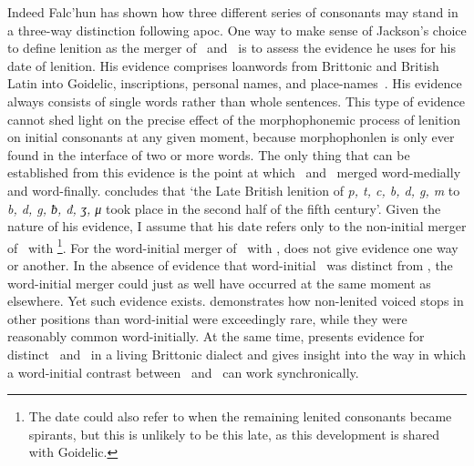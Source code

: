 Indeed Falc'hun has shown how three different series of consonants may stand in a three-way distinction following \gls{apoc}. One way to make sense of Jackson's choice to define lenition as the merger of \lT\ and \xD\  is to assess the evidence he uses for his date of lenition. His evidence comprises loanwords from Brittonic and British Latin into Goidelic, inscriptions, personal names, and place-names~\autocite[§§~133–134]{jackson_language_1953}. His evidence always consists of single words rather than whole sentences. This type of evidence cannot shed light on the precise effect of the morphophonemic process of lenition on initial consonants at any given moment, because \gls{morphophonlen} is only ever found in the interface of two or more words. The only thing that can be established from this evidence is the point at which \lT\ and \xD\ merged word-medially and word-finally. \Textcite[§~142]{jackson_language_1953} concludes that `the Late British lenition of \textit{p, t, c, b, d, g, m} to \textit{b, d, g, ƀ, đ, ʒ, μ} took place in the second half of the fifth century'. Given the nature of his evidence, I assume that his date  refers only to the non-initial merger of \lT\ with \xD\footnote{The date could also refer to when the remaining lenited consonants became spirants, but this is unlikely to be this late, as this development is shared with Goidelic.}. For the word-initial merger of \lT\ with \xD, \textcite{jackson_language_1953} does not give evidence one way or another. In the absence of evidence that word-initial \lT\ was distinct from \xD,  the word-initial merger could just as well have occurred at the same moment as elsewhere. Yet such evidence exists.  \Textcite{martinet_celtic_1952} demonstrates how non-lenited voiced stops in other positions than word-initial were exceedingly rare, while they were reasonably common word-initially. At the same time, \textcite{falchun_systeme_1951} presents evidence for distinct \xD\ and \lT\ in a living Brittonic dialect and gives  insight into the way in which a word-initial contrast between \xD\ and \lT\ can work synchronically. 


